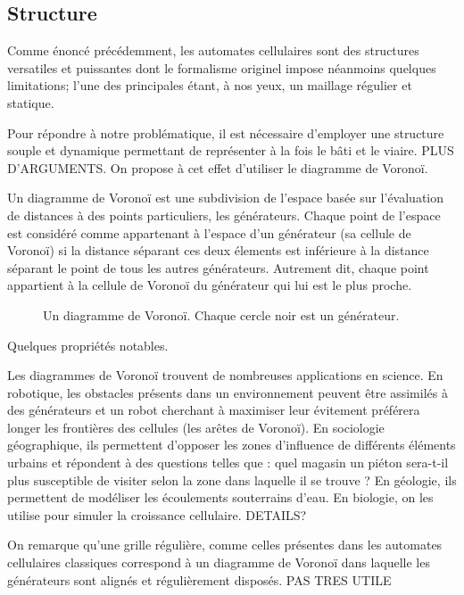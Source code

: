 \documentclass[10pt]{article}
\begin{document}
\subsection{Structure}

Comme énoncé précédemment, les automates cellulaires sont des
structures versatiles et puissantes dont le formalisme originel impose
néanmoins quelques limitations; l'une des principales étant, à nos
yeux, un maillage régulier et statique.

Pour répondre à notre problématique, il est nécessaire d'employer une
structure souple et dynamique permettant de représenter à la fois le
bâti et le viaire. PLUS D'ARGUMENTS. On propose à cet effet d'utiliser
le diagramme de Voronoï.

Un diagramme de Voronoï est une subdivision de l'espace basée sur
l'évaluation de distances à des points particuliers, les
générateurs. Chaque point de l'espace est considéré comme appartenant
à l'espace d'un générateur (sa cellule de Voronoï) si la distance
séparant ces deux élements est inférieure à la distance séparant le
point de tous les autres générateurs. Autrement dit, chaque point
appartient à la cellule de Voronoï du générateur qui lui est le plus
proche.

\begin{figure}[h]

  \caption{Un diagramme de Voronoï. Chaque cercle noir est un générateur.}
  \label{fig:voronoi}
\end{figure}

Quelques propriétés notables.

Les diagrammes de Voronoï trouvent de nombreuses applications en
science. En robotique, les obstacles présents dans un environnement
peuvent être assimilés à des générateurs et un robot cherchant à
maximiser leur évitement préférera longer les frontières des cellules
(les arêtes de Voronoï). En sociologie géographique, ils permettent
d'opposer les zones d'influence de différents éléments urbains et
répondent à des questions telles que : quel magasin un piéton
sera-t-il plus susceptible de visiter selon la zone dans laquelle il
se trouve ? En géologie, ils permettent de modéliser les écoulements
souterrains d'eau. En biologie, on les utilise pour simuler la
croissance cellulaire. DETAILS?

On remarque qu'une grille régulière, comme celles présentes dans les
automates cellulaires classiques correspond à un diagramme de Voronoï
dans laquelle les générateurs sont alignés et régulièrement
disposés. PAS TRES UTILE
\end{document}

